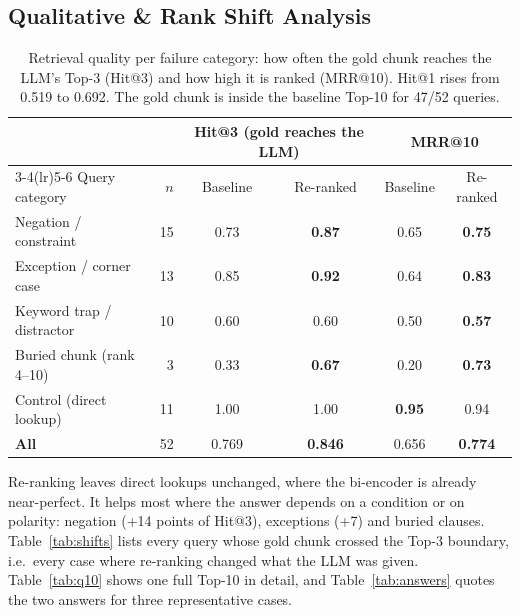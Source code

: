 \documentclass[11pt,a4paper]{article}
\begin{document}
\subsection{Qualitative \& Rank Shift Analysis}

\begin{table}[H]
\centering\small
\begin{tabular}{lrcccc}
\toprule
 & & \multicolumn{2}{c}{Hit@3 (gold reaches the LLM)} & \multicolumn{2}{c}{MRR@10} \\
\cmidrule(lr){3-4}\cmidrule(lr){5-6}
Query category & $n$ & Baseline & Re-ranked & Baseline & Re-ranked \\
\midrule
Negation / constraint      & 15 & 0.73 & \textbf{0.87} & 0.65 & \textbf{0.75} \\
Exception / corner case    & 13 & 0.85 & \textbf{0.92} & 0.64 & \textbf{0.83} \\
Keyword trap / distractor  & 10 & 0.60 & 0.60          & 0.50 & \textbf{0.57} \\
Buried chunk (rank 4--10)  &  3 & 0.33 & \textbf{0.67} & 0.20 & \textbf{0.73} \\
Control (direct lookup)    & 11 & 1.00 & 1.00          & \textbf{0.95} & 0.94 \\
\midrule
\textbf{All}               & 52 & 0.769 & \textbf{0.846} & 0.656 & \textbf{0.774} \\
\bottomrule
\end{tabular}
\caption{Retrieval quality per failure category: how often the gold chunk reaches the LLM's Top-3 (Hit@3) and how high it is ranked (MRR@10). Hit@1 rises from 0.519 to 0.692.
The gold chunk is inside the baseline Top-10 for 47/52 queries.}
\label{tab:metrics}
\end{table}

Re-ranking leaves direct lookups unchanged, where the bi-encoder is already near-perfect. It helps most where the
answer depends on a condition or on polarity: negation (+14 points of Hit@3), exceptions (+7) and buried clauses.
Table~\ref{tab:shifts} lists every query whose gold chunk crossed the Top-3 boundary, i.e.\ every case where
re-ranking changed what the LLM was given. Table~\ref{tab:q10} shows one full Top-10 in detail, and
Table~\ref{tab:answers} quotes the two answers for three representative cases.
\end{document}
